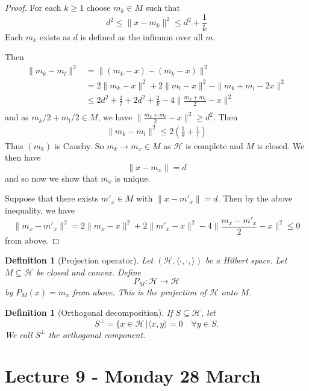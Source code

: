 \documentclass[12pt, oneside, a4paper]{article}
\theoremstyle{dfn}
\newtheorem{dfn}[thm]{Definition}
\newcommand{\hilb}{(\Hil, \langle \cdot, \cdot, \rangle )}
\newcommand{\Hil}{\mathcal{H}}
\begin{document}
\begin{proof}
    For each $k \geq 1$ choose $m_k \in M$ such that \[
        d^2 \leq \| x - m_k \|^2 \leq d^2 + \frac{1}{k} 
    \] Each $m_k$ exists as $d$ is defined as the infimum over all $m$. 
    
    Then \begin{align*}
        \| m_k - m_l \|^2   &= \| (m_k - x) - (m_k - x) \|^2 \\
                            &= 2 \| m_k - x \|^2 + 2 \| m_l - x \|^2 - \| m_k + m_l - 2x \|^2 \\
                            &\leq 2d^2 + \frac{2}{l} + 2d^2 + \frac{2}{k} - 4 \| \frac{ m_k + m_l}{2} - x \|^2 \\
    \end{align*} and as $m_k/2 + m_l/2 \in M$, we have $\| \frac{ m_k + m_l}{2} - x \|^2  \geq d^2$.  Then 
    \begin{align*}
            \| m_k - m_l \|^2 \leq 2 ( \frac{1}{k} + \frac{1}{l})
    \end{align*} Thus $(m_k)$ is Cauchy.  So $m_k \rightarrow m_x \in M$ as $\Hil$ is complete and $M$ is closed.  We then have \[
        \| x - m_x \| = d 
    \] and so now we show that $m_x$ is unique.  
    
    Suppose that there exists $m'_x \in M$ with $\| x - m'_x \| = d$.  Then by the above inequality, we have \[
        \| m_x - m'_x \|^2 = 2 \| m_x - x \|^2 + 2 \| m'_x - x \|^2 - 4 \| \frac{m_x - m'_x}{2} - x \|^2 \leq 0 
    \] from above. 
\end{proof}

\begin{dfn}[Projection operator]
Let $\hilb$ be a Hilbert space.  Let $M \subseteq \Hil$ be closed and convex.  Define \[
    P_M : \Hil \rightarrow \Hil
\] by $P_M(x) = m_x$ from above. This is the projection of $\Hil$ onto $M$.
\end{dfn}

\begin{dfn}[Orthogonal decomposition]  
    If $S \subseteq \Hil$, let \[
        S^\perp = \{ x \in \Hil
 \, | \langle x, y \rangle = 0 \quad \forall y \in S. 
\] We call $S^\perp$ the orthogonal component.
\end{dfn}


\section{Lecture 9 - Monday 28 March} %
\label{sec:lecture_9_monday_28_march}
\end{document}
